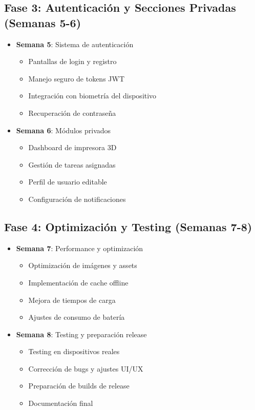 \documentclass[12pt]{article}
\begin{document}
\subsection{Fase 3: Autenticación y Secciones Privadas (Semanas 5-6)}
\begin{itemize}
    \item \textbf{Semana 5}: Sistema de autenticación
    \begin{itemize}
        \item Pantallas de login y registro
        \item Manejo seguro de tokens JWT
        \item Integración con biometría del dispositivo
        \item Recuperación de contraseña
    \end{itemize}
    
    \item \textbf{Semana 6}: Módulos privados
    \begin{itemize}
        \item Dashboard de impresora 3D
        \item Gestión de tareas asignadas
        \item Perfil de usuario editable
        \item Configuración de notificaciones
    \end{itemize}
\end{itemize}

\subsection{Fase 4: Optimización y Testing (Semanas 7-8)}
\begin{itemize}
    \item \textbf{Semana 7}: Performance y optimización
    \begin{itemize}
        \item Optimización de imágenes y assets
        \item Implementación de cache offline
        \item Mejora de tiempos de carga
        \item Ajustes de consumo de batería
    \end{itemize}
    
    \item \textbf{Semana 8}: Testing y preparación release
    \begin{itemize}
        \item Testing en dispositivos reales
        \item Corrección de bugs y ajustes UI/UX
        \item Preparación de builds de release
        \item Documentación final
    \end{itemize}
\end{itemize}
\end{document}
